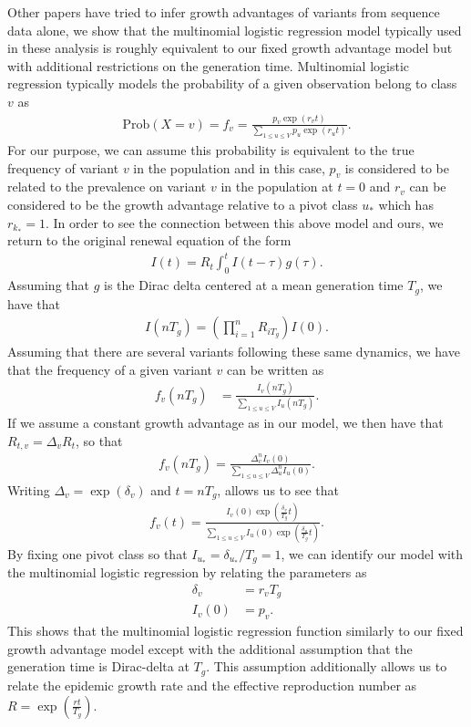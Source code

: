 \documentclass[12pt]{article}
\begin{document}
Other papers have tried to infer growth advantages of variants from sequence data alone, we show that the multinomial logistic regression model typically used in these analysis is roughly equivalent to our fixed growth advantage model but with additional restrictions on the generation time. 
Multinomial logistic regression typically models the probability of a given observation belong to class $v$ as
\begin{align*}
  \text{Prob}(X = v) = f_{v} = \frac{p_{v}\exp(r_{v} t)}{\sum_{1\leq u\leq V} p_{u}\exp(r_{u} t)}.
\end{align*}
For our purpose, we can assume this probability is equivalent to the true frequency of variant $v$ in the population and in this case, $p_{v}$ is considered to be related to the prevalence on variant $v$ in the population at $t=0$ and $r_{v}$ can be considered to be the growth advantage relative to a pivot class $u_{*}$ which has $r_{k_{*}} = 1$.
In order to see the connection between this above model and ours, we return to the original renewal equation of the form
\begin{align*}
  I(t) = R_{t}\int_{0}^{t} I(t-\tau) g(\tau).
\end{align*}
Assuming that $g$  is the Dirac delta centered at a mean generation time $T_{g}$, we have that
\begin{align*}
  I(nT_{g}) = \left(\prod_{i=1}^{n} R_{iT_{g}}\right) I(0).
\end{align*}
Assuming that there are several variants following these same dynamics, we have that the frequency of a given variant $v$ can be written as
\begin{align*}
  f_{v}(nT_{g}) &= \frac{I_{v}(nT_{g})}{\sum_{1\leq u \leq V} I_{u}(nT_{g})}.
\end{align*}
If we assume a constant growth advantage as in our model, we then have that $R_{t,v} = \Delta_{v} R_{t}$, so that
\begin{align*}
  f_{v}(nT_{g}) =  \frac{\Delta_{v}^{n} I_{v}(0)}{\sum_{1\leq u \leq V} \Delta_{u}^{n} I_{u}(0)}.
\end{align*}
Writing $\Delta_{v} = \exp(\delta_{v})$ and $t = n T_{g}$, allows us to see that
\begin{align*}
  f_{v}(t) = \frac{I_{v}(0) \exp(\frac{\delta_{v}}{T_{g}} t)}{\sum_{1\leq u \leq V}I_{u}(0) \exp(\frac{\delta_{u}}{T_{g}} t)}.
\end{align*}
By fixing one pivot class so that $I_{u_{*}} = \delta_{u_{*}} / T_{g} = 1$, we can identify our model with the multinomial logistic regression by relating the parameters as 
\begin{align*}
  \delta_{v} &= r_{v}T_{g}\\
  I_{v}(0) &= p_{v}.
\end{align*}
This shows that the multinomial logistic regression function similarly to our fixed growth advantage model except with the additional assumption that the generation time is Dirac-delta at $T_{g}$. 
This assumption additionally allows us to relate the epidemic growth rate and the effective reproduction number as $R = \exp(\frac{rt}{T_{g}})$. \cite{Wallinga2006}
\end{document}
